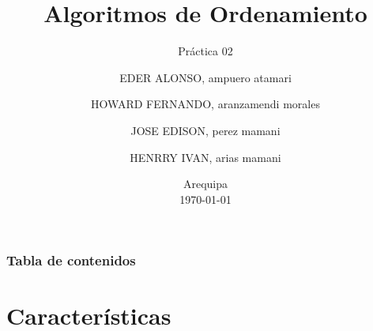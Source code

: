 \documentclass[
	11pt, %
]{beamer}
\title[ALG ORD]{Algoritmos de Ordenamiento} %
\subtitle{Práctica 02} %
\author[ ]{
EDER ALONSO, ampuero atamari \\ \and
HOWARD FERNANDO, aranzamendi morales \\ \and
JOSE EDISON, perez mamani \\ \and
HENRRY IVAN, arias mamani}
\institute[UC]{Universidad Nacional San Agustín de Arequipa \\ \smallskip \textit{ }} %
\date[\today]{Arequipa \\ \today} %
\begin{document}

\begin{frame}
	\titlepage %
\end{frame}



\begin{frame}
	\frametitle{Tabla de contenidos} %
	
	\tableofcontents %
\end{frame}


\section{Características} %
\end{document}
